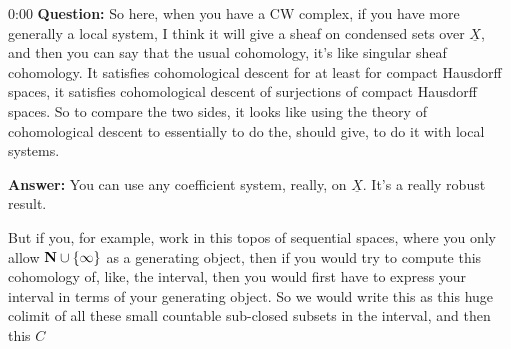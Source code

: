 \begin{unfinished}{0:00}
\textbf{Question:} So here, when you have a CW complex, if you have more generally a local system, I think it will give a sheaf on condensed sets over $\underline{X}$, and then you can say that the usual cohomology, it's like singular sheaf cohomology. It satisfies cohomological descent for at least for compact Hausdorff spaces, it satisfies cohomological descent of surjections of compact Hausdorff spaces. So to compare the two sides, it looks like using the theory of cohomological descent to essentially to do the, should give, to do it with local systems. 

\textbf{Answer:} You can use any coefficient system, really, on $\underline{X}$. It's a really robust result.

But if you, for example, work in this topos of sequential spaces, where you only allow $\mathbf N \cup \{\infty\}$ as a generating object, then if you would try to compute this cohomology of, like, the interval, then you would first have to express your interval in terms of your generating object. So we would write this as this huge colimit of all these small countable sub-closed subsets in the interval, and then this $C$

\end{unfinished}